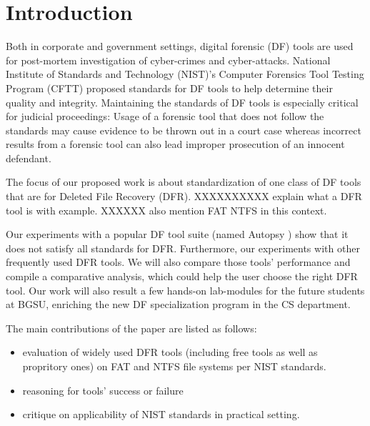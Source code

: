 
\section{Introduction}

Both in corporate and government settings, digital forensic (DF) tools are used for post-mortem investigation of cyber-crimes and cyber-attacks. 
National Institute of Standards and Technology (NIST)'s Computer Forensics Tool Testing Program (CFTT) \cite{cftt:nist} 
proposed standards for DF tools to help determine their quality and integrity. Maintaining the standards of DF tools 
is especially critical for judicial proceedings: Usage of a forensic tool that does not follow the standards may cause evidence to be thrown 
out in a court case whereas incorrect results from a forensic tool can also lead improper prosecution of an innocent defendant. 

The focus of our proposed work is about standardization of one class of DF 
tools that are for Deleted File Recovery (DFR). XXXXXXXXXX explain what a DFR tool is with example. 
XXXXXX also mention FAT NTFS in this context.
 
Our experiments with a popular DF tool suite (named Autopsy \cite{autopsy}) show that it does not satisfy all standards for DFR. 
Furthermore, our experiments with other frequently used DFR tools. 
We will also compare those tools' performance and compile a comparative analysis, which could help the user choose the right DFR tool. 
Our work will also result a few hands-on lab-modules for the future students at BGSU, enriching the new DF specialization program in the CS department.

The main contributions of the paper are listed as follows:
\begin{itemize}
\item evaluation of widely used DFR tools (including free tools as well as propritory ones) on FAT and NTFS file systems per NIST standards.
\item reasoning for tools' success or failure
\item critique on applicability of NIST standards in practical setting. 
\end{itemize}
